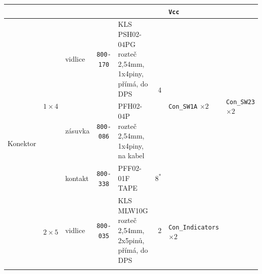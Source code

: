 \documentclass[twoside,project,skipblank]{../MFFPrace}
\begin{document}
\begin{landscape}
\begin{table}[!h]
\begin{tabular}{|l|l|l||c|l|r||l|l|l|l|}
            \multicolumn{3}{|l||}{}                                                                              &                                         &                                                                                             &                               & \texttt{Vcc}                                                & \multicolumn{3}{l|}{}                                                                                                                                                                                \\\hline
            \multirow{5}{*}{Konektor}                                                                            & \multirow{3}{*}{$1\times 4$}            & vidlice                                                                                     & \texttt{800-170}              & \tiny{KLS PSH02-04PG rozteč 2,54mm, 1x4piny, přímá, do DPS} & \multirow{2}{*}{4}                                 & \multicolumn{2}{l|}{\multirow{3}{*}{\texttt{Con\_SW1A} $\times 2$}}       & \multicolumn{2}{l|}{\multirow{3}{*}{\texttt{Con\_SW23} $\times 2$}} \\\cline{3-5}
                                                                                                                 &                                         & zásuvka                                                                                     & \texttt{800-086}              & \tiny{PFH02-04P rozteč 2,54mm, 1x4piny, na kabel}           &                                                    & \multicolumn{2}{l|}{}                                                     & \multicolumn{2}{l|}{}                                               \\\cline{3-6}
                                                                                                                 &                                         & kontakt                                                                                     & \texttt{800-338}              & \tiny{PFF02-01F TAPE}                                       & $8^*$                                              & \multicolumn{2}{l|}{}                                                     & \multicolumn{2}{l|}{}                                               \\\cline{2-10}
                                                                                                                 & \multirow{2}{*}{$2\times 5$}            & vidlice                                                                                     & \texttt{800-035}              & \tiny{KLS MLW10G rozteč 2,54mm, 2x5pinů, přímá, do DPS}     & 2                                                  & \multicolumn{3}{l|}{\multirow{2}{*}{\texttt{Con\_Indicators} $\times 2$}} &                                                                     \\\cline{3-6}

\end{tabular}
\end{table}
\end{landscape}
\end{document}
